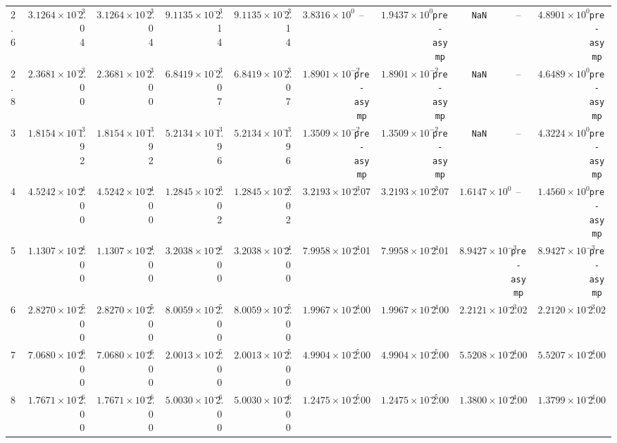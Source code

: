 \begin{table}
{\begin{tabular}{l cc cc cc cc cc cc cc cc}
2.6 & $3.1264\times10^{-3}$ & 2.04 & $3.1264\times10^{-3}$ & 2.04 & $9.1135\times10^{-3}$ & 2.14 & $9.1135\times10^{-3}$ & 2.14 & $3.8316\times10^{0}$ & -- & $1.9437\times10^{0}$ & \texttt{pre-asymp} & \texttt{NaN} & -- & $4.8901\times10^{0}$ & \texttt{pre-asymp} \\
2.8 & $2.3681\times10^{-3}$ & 2.00 & $2.3681\times10^{-3}$ & 2.00 & $6.8419\times10^{-3}$ & 2.07 & $6.8419\times10^{-3}$ & 2.07 & $1.8901\times10^{-2}$ & \texttt{pre-asymp} & $1.8901\times10^{-2}$ & \texttt{pre-asymp} & \texttt{NaN} & -- & $4.6489\times10^{0}$ & \texttt{pre-asymp} \\
3 & $1.8154\times10^{-3}$ & 1.92 & $1.8154\times10^{-3}$ & 1.92 & $5.2134\times10^{-3}$ & 1.96 & $5.2134\times10^{-3}$ & 1.96 & $1.3509\times10^{-2}$ & \texttt{pre-asymp} & $1.3509\times10^{-2}$ & \texttt{pre-asymp} & \texttt{NaN} & -- & $4.3224\times10^{0}$ & \texttt{pre-asymp} \\
4 & $4.5242\times10^{-4}$ & 2.00 & $4.5242\times10^{-4}$ & 2.00 & $1.2845\times10^{-3}$ & 2.02 & $1.2845\times10^{-3}$ & 2.02 & $3.2193\times10^{-3}$ & 2.07 & $3.2193\times10^{-3}$ & 2.07 & $1.6147\times10^{0}$ & -- & $1.4560\times10^{0}$ & \texttt{pre-asymp} \\
5 & $1.1307\times10^{-4}$ & 2.00 & $1.1307\times10^{-4}$ & 2.00 & $3.2038\times10^{-4}$ & 2.00 & $3.2038\times10^{-4}$ & 2.00 & $7.9958\times10^{-4}$ & 2.01 & $7.9958\times10^{-4}$ & 2.01 & $8.9427\times10^{-3}$ & \texttt{pre-asymp} & $8.9427\times10^{-3}$ & \texttt{pre-asymp} \\
6 & $2.8270\times10^{-5}$ & 2.00 & $2.8270\times10^{-5}$ & 2.00 & $8.0059\times10^{-5}$ & 2.00 & $8.0059\times10^{-5}$ & 2.00 & $1.9967\times10^{-4}$ & 2.00 & $1.9967\times10^{-4}$ & 2.00 & $2.2121\times10^{-3}$ & 2.02 & $2.2120\times10^{-3}$ & 2.02 \\
7 & $7.0680\times10^{-6}$ & 2.00 & $7.0680\times10^{-6}$ & 2.00 & $2.0013\times10^{-5}$ & 2.00 & $2.0013\times10^{-5}$ & 2.00 & $4.9904\times10^{-5}$ & 2.00 & $4.9904\times10^{-5}$ & 2.00 & $5.5208\times10^{-4}$ & 2.00 & $5.5207\times10^{-4}$ & 2.00 \\
8 & $1.7671\times10^{-6}$ & 2.00 & $1.7671\times10^{-6}$ & 2.00 & $5.0030\times10^{-6}$ & 2.00 & $5.0030\times10^{-6}$ & 2.00 & $1.2475\times10^{-5}$ & 2.00 & $1.2475\times10^{-5}$ & 2.00 & $1.3800\times10^{-4}$ & 2.00 & $1.3799\times10^{-4}$ & 2.00 \\
\bottomrule
\end{tabular}}
\end{table}
